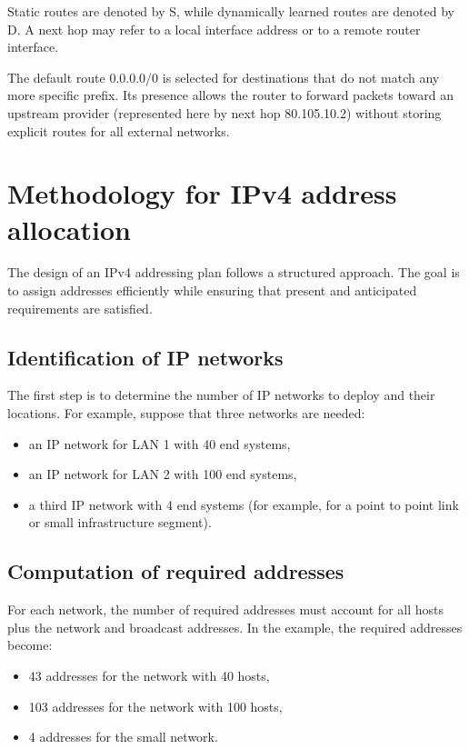 Static routes are denoted by S, while dynamically learned routes are denoted by D. A next hop may refer to a local interface address or to a remote router interface.

The default route 0.0.0.0/0 is selected for destinations that do not match any more specific prefix. Its presence allows the router to forward packets toward an upstream provider (represented here by next hop 80.105.10.2) without storing explicit routes for all external networks.

\section{Methodology for IPv4 address allocation}

The design of an IPv4 addressing plan follows a structured approach. The goal is to assign addresses efficiently while ensuring that present and anticipated requirements are satisfied.

\begin{center}
\end{center}

\subsection{Identification of IP networks}

The first step is to determine the number of IP networks to deploy and their locations. For example, suppose that three networks are needed:

\begin{itemize}
\item an IP network for LAN 1 with 40 end systems,
\item an IP network for LAN 2 with 100 end systems,
\item a third IP network with 4 end systems (for example, for a point to point link or small infrastructure segment).
\end{itemize}

\subsection{Computation of required addresses}

For each network, the number of required addresses must account for all hosts plus the network and broadcast addresses. In the example, the required addresses become:

\begin{itemize}
\item 43 addresses for the network with 40 hosts,
\item 103 addresses for the network with 100 hosts,
\item 4 addresses for the small network.
\end{itemize}

